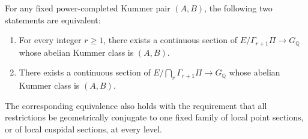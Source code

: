 \begin{theorem}
\label{thm:ghost-fixed-pair-compatible}
For any fixed power-completed Kummer pair \((A,B)\), the following
two statements are equivalent:
\begin{enumerate}
 \item For every integer \(r\geq1\), there exists a continuous
 section of \(E/\Gamma_{r+1}\Pi\to G_{\mathbb Q}\) whose
 abelian Kummer class is \((A,B)\).
 \item There exists a continuous section of
 \(E/\bigcap_r\Gamma_{r+1}\Pi\to G_{\mathbb Q}\) whose
 abelian Kummer class is \((A,B)\).
\end{enumerate}
The corresponding equivalence also holds with the requirement
that all restrictions be geometrically conjugate to one fixed
family of local point sections, or of local cuspidal sections,
at every level.
\end{theorem}

